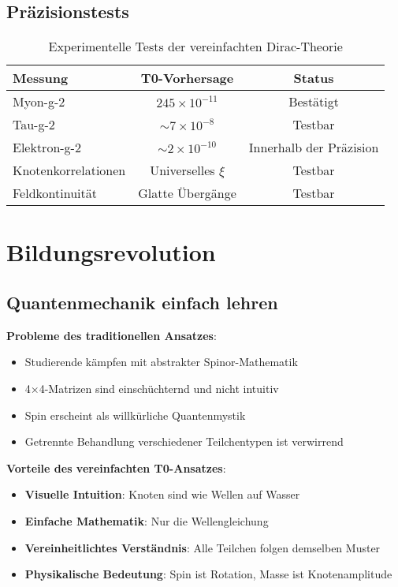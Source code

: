 \documentclass[12pt,a4paper]{article}
\newcommand{\xipar}{\xi}
\theoremstyle{definition}
\theoremstyle{remark}
\begin{document}
	\subsection{Präzisionstests}
	
	\begin{table}[htbp]
		\centering
		\begin{tabular}{lcc}
			\toprule
			\textbf{Messung} & \textbf{T0-Vorhersage} & \textbf{Status} \\
			\midrule
			Myon-g-2 & $245 \times 10^{-11}$ & \checkmark Bestätigt \\
			Tau-g-2 & $\sim 7 \times 10^{-8}$ & Testbar \\
			Elektron-g-2 & $\sim 2 \times 10^{-10}$ & Innerhalb der Präzision \\
			Knotenkorrelationen & Universelles $\xipar$ & Testbar \\
			Feldkontinuität & Glatte Übergänge & Testbar \\
			\bottomrule
		\end{tabular}
		\caption{Experimentelle Tests der vereinfachten Dirac-Theorie}
		\label{tab:experimental_tests}
	\end{table}
	
	\section{Bildungsrevolution}
	
	\subsection{Quantenmechanik einfach lehren}
	
	\textbf{Probleme des traditionellen Ansatzes}:
	\begin{itemize}
		\item Studierende kämpfen mit abstrakter Spinor-Mathematik
		\item 4×4-Matrizen sind einschüchternd und nicht intuitiv
		\item Spin erscheint als willkürliche Quantenmystik
		\item Getrennte Behandlung verschiedener Teilchentypen ist verwirrend
	\end{itemize}
	
	\textbf{Vorteile des vereinfachten T0-Ansatzes}:
	\begin{itemize}
		\item \textbf{Visuelle Intuition}: Knoten sind wie Wellen auf Wasser
		\item \textbf{Einfache Mathematik}: Nur die Wellengleichung
		\item \textbf{Vereinheitlichtes Verständnis}: Alle Teilchen folgen demselben Muster
		\item \textbf{Physikalische Bedeutung}: Spin ist Rotation, Masse ist Knotenamplitude
	\end{itemize}
	
\end{document}
